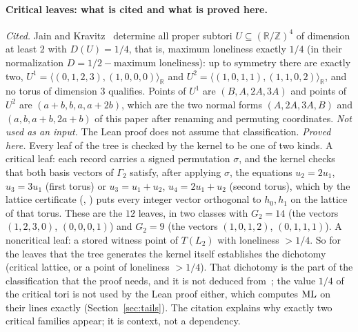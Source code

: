 \documentclass[11pt]{article}
\theoremstyle{remark}
\newcommand{\R}{\mathbb{R}}
\newcommand{\Z}{\mathbb{Z}}
\newcommand{\lean}[1]{{\small\texttt{\detokenize{#1}}}}
\begin{document}
\paragraph{Critical leaves: what is cited and what is proved here.} \emph{Cited.} Jain and Kravitz~\cite[Section~3.3]{JK} determine all proper subtori $U\subseteq(\R/\Z)^4$ of dimension at least $2$ with $D(U)=1/4$, that is, maximum loneliness exactly $1/4$ (in their normalization $D=1/2-\text{maximum loneliness}$): up to symmetry there are exactly two, $U^1=\langle(0,1,2,3),(1,0,0,0)\rangle_\R$ and $U^2=\langle(1,0,1,1),(1,1,0,2)\rangle_\R$, and no torus of dimension $3$ qualifies. Points of $U^1$ are $(B,A,2A,3A)$ and points of $U^2$ are $(a+b,b,a,a+2b)$, which are the two normal forms $(A,2A,3A,B)$ and $(a,b,a+b,2a+b)$ of this paper after renaming and permuting coordinates. \emph{Not used as an input.} The Lean proof does not assume that classification. \emph{Proved here.} Every leaf of the tree is checked by the kernel to be one of two kinds. A critical leaf: each record carries a signed permutation $\sigma$, and the kernel checks that both basis vectors of $\Gamma_2$ satisfy, after applying $\sigma$, the equations $u_2=2u_1$, $u_3=3u_1$ (first torus) or $u_3=u_1+u_2$, $u_4=2u_1+u_2$ (second torus), which by the lattice certificate (\lean{LeafBQP}, \lean{crit_link4}) puts every integer vector orthogonal to $h_0,h_1$ on the lattice of that torus. These are the $12$ leaves, in two classes with $G_2=14$ (the vectors $(1,2,3,0)$, $(0,0,0,1)$) and $G_2=9$ (the vectors $(1,0,1,2)$, $(0,1,1,1)$). A noncritical leaf: a stored witness point of $T(L_2)$ with loneliness $>1/4$. So for the leaves that the tree generates the kernel itself establishes the dichotomy (critical lattice, or a point of loneliness $>1/4$). That dichotomy is the part of the classification that the proof needs, and it is not deduced from~\cite{JK}; the value $1/4$ of the critical tori is not used by the Lean proof either, which computes $\mathrm{ML}$ on their lines exactly (Section~\ref{sec:tails}). The citation explains why exactly two critical families appear; it is context, not a dependency.
\end{document}
